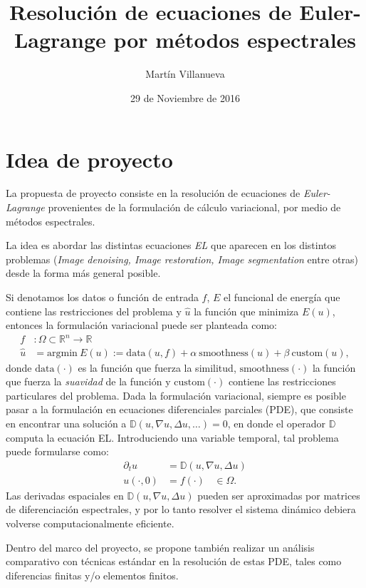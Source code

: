 \documentclass[spanish, fleqn]{article}
\title{Resolución de ecuaciones de Euler-Lagrange por métodos espectrales}
\author{Martín Villanueva}
\date{29 de Noviembre de 2016}
\begin{document}
\maketitle



\section{Idea de proyecto}


La propuesta de proyecto consiste en la resolución de ecuaciones de \textit{Euler-Lagrange} provenientes de la formulación de cálculo variacional, por medio de métodos espectrales.  


La idea es abordar las distintas ecuaciones \textit{EL} que aparecen en los distintos problemas (\textit{Image denoising, Image restoration, Image segmentation} entre otras) desde la forma más general posible.


Si denotamos los datos o función de entrada $f$, $E$ el funcional de energía que contiene las restricciones del problema y $\hat{u}$ la función  que minimiza $E(u)$, entonces la formulación variacional puede ser planteada como:
\begin{align*}
f &: \Omega \subset \mathbb{R}^n \rightarrow \mathbb{R} \\
\hat{u} &= \text{argmin} \ E(u) :=  \text{data}(u,f) + \alpha \ \text{smoothness}(u) + \beta \ \text{custom}(u),
\end{align*}
donde $\text{data}(\cdot)$ es la función que fuerza la similitud, $\text{smoothness}(\cdot)$ la función que fuerza la \textit{suavidad} de la función y $\text{custom}(\cdot)$ contiene las restricciones particulares del problema. Dada la formulación variacional, siempre es posible pasar a la formulación en ecuaciones diferenciales parciales (PDE), que consiste en encontrar una solución a $\mathbb{D}(u, \nabla u, \Delta u, \ldots)=0$, en donde el operador $\mathbb{D}$ computa la ecuación EL. Introduciendo una variable temporal, tal problema puede formularse como:
\begin{align*}
\partial_t u &= \mathbb{D}(u, \nabla u, \Delta u) \\
u(\cdot,0) &= f(\cdot) \ \ \ \ \in \Omega.
\end{align*}
Las derivadas espaciales en $\mathbb{D}(u, \nabla u, \Delta u)$ pueden ser aproximadas por matrices de diferenciación espectrales, y por lo tanto resolver el sistema dinámico debiera volverse computacionalmente eficiente.
\newline


Dentro del marco del proyecto, se propone también realizar un análisis comparativo con técnicas estándar en la resolución de estas PDE, tales como diferencias finitas y/o elementos finitos.
\end{document}
